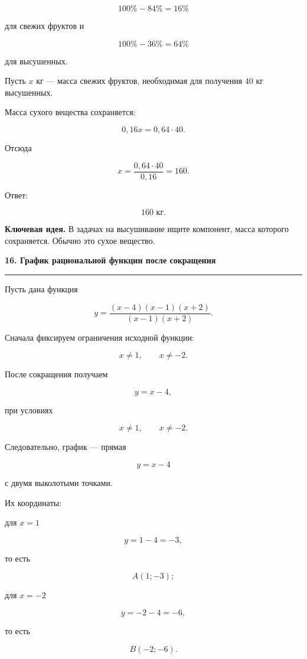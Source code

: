 \documentclass[a4paper,12pt]{article}
\newcommand{\topic}[1]{%
    \vspace{0.5em}
    {\Large\bfseries\textcolor{darkaccent}{#1}}\par
    \vspace{0.2em}
    {\color{accent}\rule{\linewidth}{0.7pt}}
    \vspace{0.5em}
}
\newcommand{\keyidea}[1]{%
    \par\smallskip
    \textbf{\textcolor{darkaccent}{Ключевая идея.}} #1
    \par\smallskip
}
\begin{document}
\[
100\%-84\%=16\%
\]

для свежих фруктов и

\[
100\%-36\%=64\%
\]

для высушенных.

Пусть \(x\) кг --- масса свежих фруктов, необходимая для получения \(40\) кг высушенных.

Масса сухого вещества сохраняется:

\[
0{,}16x=0{,}64\cdot40.
\]

Отсюда

\[
x=\frac{0{,}64\cdot40}{0{,}16}=160.
\]

Ответ:

\[
\boxed{160\text{ кг}}.
\]

\keyidea{
В задачах на высушивание ищите компонент, масса которого сохраняется. Обычно это сухое вещество.
}


\topic{16. График рациональной функции после сокращения}

Пусть дана функция

\[
y=
\frac{(x-4)(x-1)(x+2)}
     {(x-1)(x+2)}.
\]

Сначала фиксируем ограничения исходной функции:

\[
x\ne1,
\qquad
x\ne-2.
\]

После сокращения получаем

\[
y=x-4,
\]

при условиях

\[
x\ne1,\qquad x\ne-2.
\]

Следовательно, график --- прямая

\[
y=x-4
\]

с двумя выколотыми точками.

Их координаты:

для \(x=1\)

\[
y=1-4=-3,
\]

то есть

\[
A(1;-3);
\]

для \(x=-2\)

\[
y=-2-4=-6,
\]

то есть

\[
B(-2;-6).
\]
\end{document}
